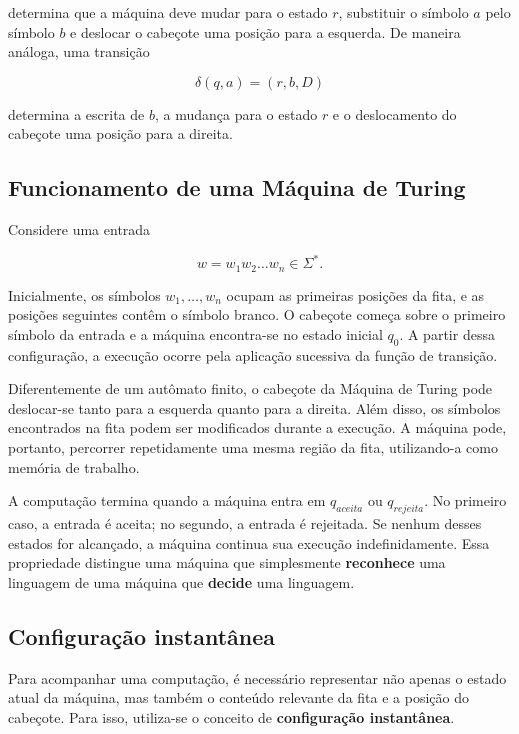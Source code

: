 \documentclass[
  brazilian,
  letterpaper,
]{book}
\theoremstyle{plain}
\theoremstyle{definition}
\theoremstyle{remark}
\begin{document}
determina que a máquina deve mudar para o estado \(r\), substituir o
símbolo \(a\) pelo símbolo \(b\) e deslocar o cabeçote uma posição para
a esquerda. De maneira análoga, uma transição

\[
\delta(q,a)=(r,b,D)
\]

determina a escrita de \(b\), a mudança para o estado \(r\) e o
deslocamento do cabeçote uma posição para a direita.

\subsection{Funcionamento de uma Máquina de
Turing}\label{funcionamento-de-uma-muxe1quina-de-turing}

Considere uma entrada

\[
w=w_1w_2\ldots w_n\in\Sigma^*.
\]

Inicialmente, os símbolos \(w_1,\ldots,w_n\) ocupam as primeiras
posições da fita, e as posições seguintes contêm o símbolo branco. O
cabeçote começa sobre o primeiro símbolo da entrada e a máquina
encontra-se no estado inicial \(q_0\). A partir dessa configuração, a
execução ocorre pela aplicação sucessiva da função de transição.

Diferentemente de um autômato finito, o cabeçote da Máquina de Turing
pode deslocar-se tanto para a esquerda quanto para a direita. Além
disso, os símbolos encontrados na fita podem ser modificados durante a
execução. A máquina pode, portanto, percorrer repetidamente uma mesma
região da fita, utilizando-a como memória de trabalho.

A computação termina quando a máquina entra em \(q_{aceita}\) ou
\(q_{rejeita}\). No primeiro caso, a entrada é aceita; no segundo, a
entrada é rejeitada. Se nenhum desses estados for alcançado, a máquina
continua sua execução indefinidamente. Essa propriedade distingue uma
máquina que simplesmente \textbf{reconhece} uma linguagem de uma máquina
que \textbf{decide} uma linguagem.

\subsection{Configuração
instantânea}\label{configurauxe7uxe3o-instantuxe2nea-1}

Para acompanhar uma computação, é necessário representar não apenas o
estado atual da máquina, mas também o conteúdo relevante da fita e a
posição do cabeçote. Para isso, utiliza-se o conceito de
\textbf{configuração instantânea}.
\end{document}
